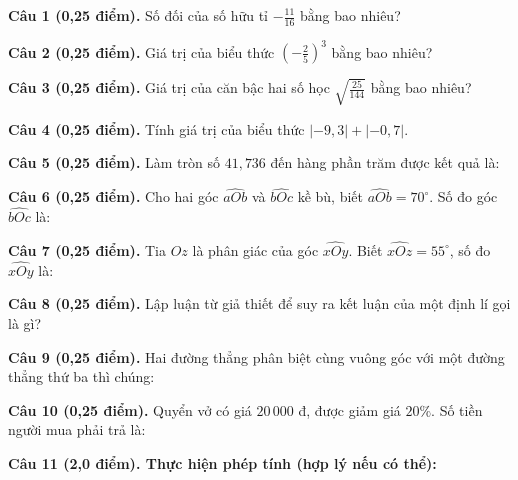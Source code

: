 \documentclass[12pt,a4paper]{article}
\begin{document}
\noindent\textbf{Câu 1 (0,25 điểm).} Số đối của số hữu tỉ $-\frac{11}{16}$ bằng bao nhiêu? \par\vspace{0.5mm}
\noindent\textbf{Câu 2 (0,25 điểm).} Giá trị của biểu thức $\left(-\frac{2}{5}\right)^3$ bằng bao nhiêu? \par\vspace{0.5mm}
\noindent\textbf{Câu 3 (0,25 điểm).} Giá trị của căn bậc hai số học $\sqrt{\frac{25}{144}}$ bằng bao nhiêu? \par\vspace{0.5mm}
\noindent\textbf{Câu 4 (0,25 điểm).} Tính giá trị của biểu thức $\lvert -9{,}3\rvert + \lvert -0{,}7\rvert$. \par\vspace{0.5mm}
\noindent\textbf{Câu 5 (0,25 điểm).} Làm tròn số $41{,}736$ đến hàng phần trăm được kết quả là: \par\vspace{0.5mm}
\noindent\textbf{Câu 6 (0,25 điểm).} Cho hai góc $\widehat{aOb}$ và $\widehat{bOc}$ kề bù, biết $\widehat{aOb}=70^\circ$. Số đo góc $\widehat{bOc}$ là: \par\vspace{0.5mm}
\noindent\textbf{Câu 7 (0,25 điểm).} Tia $Oz$ là phân giác của góc $\widehat{xOy}$. Biết $\widehat{xOz}=55^\circ$, số đo $\widehat{xOy}$ là: \par\vspace{0.5mm}
\noindent\textbf{Câu 8 (0,25 điểm).} Lập luận từ giả thiết để suy ra kết luận của một định lí gọi là gì? \par\vspace{0.5mm}
\noindent\textbf{Câu 9 (0,25 điểm).} Hai đường thẳng phân biệt cùng vuông góc với một đường thẳng thứ ba thì chúng: \par\vspace{0.5mm}
\noindent\textbf{Câu 10 (0,25 điểm).} Quyển vở có giá $20\,000$ đ, được giảm giá $20\%$. Số tiền người mua phải trả là: \par\vspace{0.5mm}
\vspace{0.6mm}

\noindent\textbf{Câu 11 (2,0 điểm). Thực hiện phép tính (hợp lý nếu có thể):}
\vspace{0.8mm}
\end{document}
